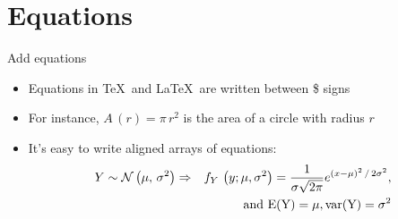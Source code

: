 \documentclass[12pt, aspectratio=169, xcolor=pdftex]{beamer}
\begin{document}
\section{Equations}
\begin{frame}{Add equations}
\begin{itemize}
\item{Equations in \TeX \ and \LaTeX\  are written between \$ signs}
\item{For instance, 
$A\,(r) = \pi\,r^2$ is the area of a circle with radius $r$}
\item{It's easy to write aligned arrays of equations:}
\begin{eqnarray*} %
Y \sim  \mathcal{N}\left(\mu,\,\sigma^{2}\right) & \Rightarrow & 
f_Y\,\left(y; \mu,\sigma^{2}\right) = 
\frac{1}{\sigma \sqrt {2\pi }}
e^{ \left(x - \mu \right)^2\,/\,2\sigma^2}, \\
 & & \rm{and}\  \rm{E} (Y) = \mu, \rm{var}(Y) = \sigma^2 \\
\end{eqnarray*}

\end{itemize}
\end{frame}
\end{document}
